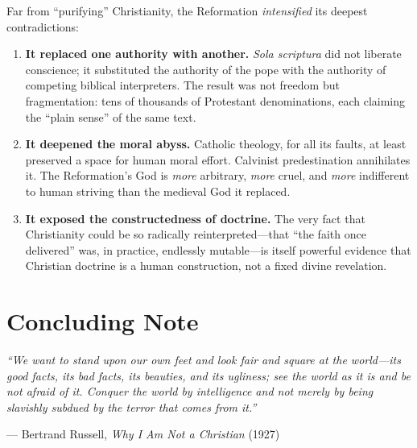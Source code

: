 \documentclass[11pt,twoside]{article}
\begin{document}
\begin{scheda}

Far from ``purifying'' Christianity, the Reformation \emph{intensified} its
deepest contradictions:

\begin{enumerate}
  \item \textbf{It replaced one authority with another.}
    \textit{Sola scriptura} did not liberate conscience; it substituted the
    authority of the pope with the authority of
    competing biblical interpreters.  The result was not freedom but
    fragmentation: tens of thousands of Protestant
    denominations, each claiming the
    ``plain sense'' of the same text.

  \item \textbf{It deepened the moral abyss.}
    Catholic theology, for all its faults, at least preserved a space for
    human moral effort.  Calvinist predestination annihilates it.  The
    Reformation's God is \emph{more} arbitrary, \emph{more} cruel, and
    \emph{more} indifferent to human striving than the medieval God it
    replaced.

  \item \textbf{It exposed the constructedness of doctrine.}
    The very fact that Christianity could be so radically reinterpreted---that
    ``the faith once delivered'' was, in practice, endlessly mutable---is
    itself powerful evidence that Christian doctrine is a human
    construction, not a
    fixed divine revelation.
\end{enumerate}
\end{scheda}

\newpage

\section*{Concluding Note}

\begin{citazione}
\textit{``We want to stand upon our own feet and look fair and square at the
world---its good facts, its bad facts, its beauties, and its ugliness; see
the world as it is and be not afraid of it.  Conquer the world by
intelligence and not merely by being slavishly subdued by the terror that
comes from it.''}

\medskip
\hfill--- Bertrand Russell, \textit{Why I Am Not a Christian} (1927)
\end{citazione}
\end{document}
